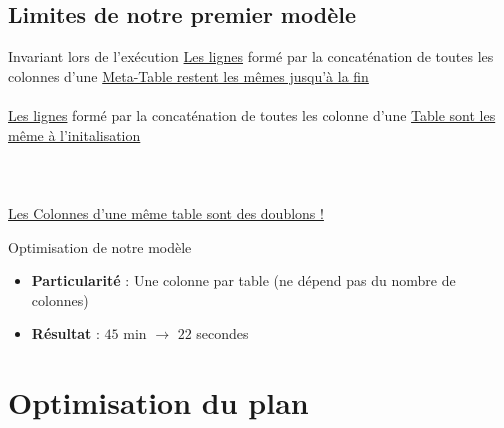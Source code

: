 \documentclass[aspectratio=43,12pt]{beamer}
\begin{document}
\subsection{Limites de notre premier modèle}
\begin{frame}{Invariant lors de l'exécution}
    \underline{Les lignes} formé par la concaténation de toutes les colonnes d'une \underline{Meta-Table restent les mêmes jusqu'à la fin}
    ~\\~\\
    \underline{Les lignes} formé par la concaténation de toutes les colonne d'une \underline{Table sont les même à l'initalisation}
    ~\\~\\  ~\\~\\

    \underline{Les Colonnes d'une même table sont des doublons !}

\end{frame}
\begin{frame}{Optimisation de notre modèle}
    \begin{center}
    \end{center}

    \begin{itemize}
        \item \textbf{Particularité} : Une colonne par table (ne dépend pas du nombre de colonnes)
        \item \textbf{ Résultat} : \(45\) min \(\to\) \(22\) secondes
    \end{itemize}
\end{frame}

\section{Optimisation du plan}
\end{document}
